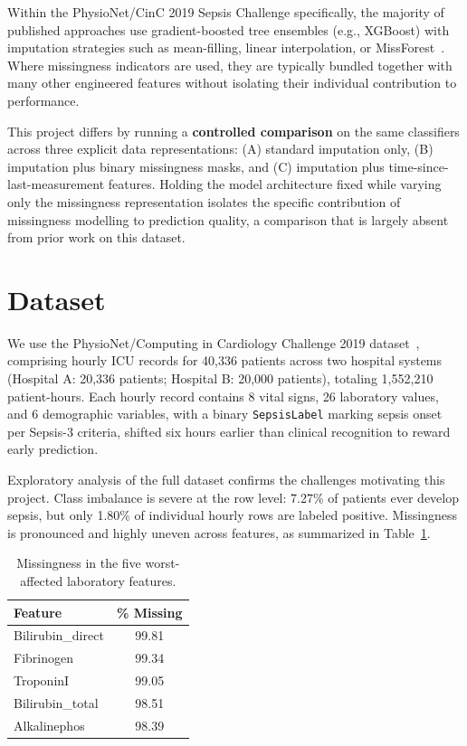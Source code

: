 \documentclass[11pt,a4paper]{article}
\begin{document}
Within the PhysioNet/CinC 2019 Sepsis Challenge specifically, the majority of
published approaches use gradient-boosted tree ensembles (e.g., XGBoost) with
imputation strategies such as mean-filling, linear interpolation, or
MissForest~\cite{cinc2019survey}. Where missingness indicators are used, they
are typically bundled together with many other engineered features without
isolating their individual contribution to performance.

This project differs by running a \textbf{controlled comparison} on the same
classifiers across three explicit data representations: (A) standard
imputation only, (B) imputation plus binary missingness masks, and (C)
imputation plus time-since-last-measurement features. Holding the model
architecture fixed while varying only the missingness representation isolates
the specific contribution of missingness modelling to prediction quality, a
comparison that is largely absent from prior work on this dataset.

\section{Dataset}

We use the PhysioNet/Computing in Cardiology Challenge 2019
dataset~\cite{reyna2019}, comprising hourly ICU records for 40{,}336 patients
across two hospital systems (Hospital A: 20{,}336 patients; Hospital B:
20{,}000 patients), totaling 1{,}552{,}210 patient-hours. Each hourly record
contains 8 vital signs, 26 laboratory values, and 6 demographic variables,
with a binary \texttt{SepsisLabel} marking sepsis onset per Sepsis-3 criteria,
shifted six hours earlier than clinical recognition to reward early
prediction.

Exploratory analysis of the full dataset confirms the challenges motivating
this project. Class imbalance is severe at the row level: 7.27\% of patients
ever develop sepsis, but only 1.80\% of individual hourly rows are labeled
positive. Missingness is pronounced and highly uneven across features, as
summarized in Table~\ref{tab:missingness}.

\begin{table}[h]
\centering
\caption{Missingness in the five worst-affected laboratory features.}
\label{tab:missingness}
\begin{tabular}{lc}
\toprule
\textbf{Feature} & \textbf{\% Missing} \\
\midrule
Bilirubin\_direct & 99.81 \\
Fibrinogen        & 99.34 \\
TroponinI         & 99.05 \\
Bilirubin\_total   & 98.51 \\
Alkalinephos      & 98.39 \\
\bottomrule
\end{tabular}
\end{table}
\end{document}
